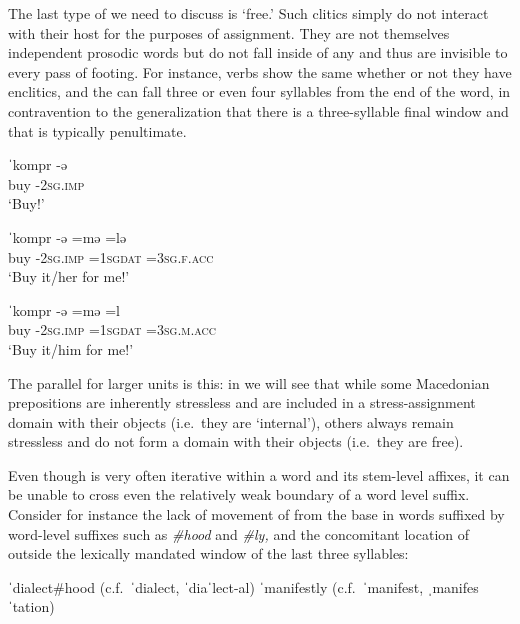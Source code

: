 \documentclass[output=paper,
modfonts
]{LSP/langsci}
\begin{document}
\begin{exe}
The last type of  we need to discuss is ‘free.’ Such clitics simply do not interact with their host for the purposes of  assignment. They are not themselves independent prosodic words but do not fall inside of any  and thus are invisible to every pass of footing. For instance,  verbs \citep{torres-Tamarit2015} show the same  whether or not they have enclitics, and the  can fall three or even four syllables from the end of the word, in contravention to the generalization that there is a three-syllable final  window and that  is typically penultimate. 

\ea \label{ex:kaisse:12}  \citep{torres-Tamarit2015}
	\ea \label{ex:kaisse:12a} \gll ˈkompr \squish-ə\\
	buy \squish-\textsc{2sg.imp}\\
	\glt  `Buy!'
	
	\ex \label{ex:kaisse:12b} \gll ˈkompr \squish-ə  \squish=mə  \squish=lə\\
	buy \squish\textsc{-2sg.imp} \squish\textsc{=1sgdat} \squish\textsc{=3sg.f.acc}\\
	\glt `Buy it/her for me!'

	\ex \label{ex:kaisse:12c} \gll ˈkompr \squish-ə  \squish=mə  \squish=l\\
	buy \squish-\textsc{2sg.imp} \squish\textsc{=1sgdat} \squish\textsc{=3sg.m.acc}\\
	\glt `Buy it/him for me!'
	\z
\z

\noindent The parallel for larger units is this: in  we will see that  while some Macedonian prepositions are inherently stressless and are included in a stress-assignment domain with their objects (i.e.\ they are ‘internal’), others always remain stressless and do not form a domain with their objects (i.e.\ they are free). 

Even though  is very often iterative within a word and its stem-level affixes, it can be unable to cross even the relatively weak boundary of a word level suffix. Consider for instance the lack of movement of  from the base in  words suffixed by word-level suffixes such as \textit{\#hood} and \textit{\#ly,} and the concomitant location of  outside the lexically mandated window of the last three syllables:

\ea \label{ex:kaisse:13} 
	\ea \label{ex:kaisse:13a} ˈdialect\#hood (c.f.\ ˈdialect, ˈdiaˈlect-al)
	\ex \label{ex:kaisse:13b} ˈmanifestly (c.f.\ ˈmanifest, ˌmanifesˈtation)
	\z
\z


\end{exe}
\end{document}
